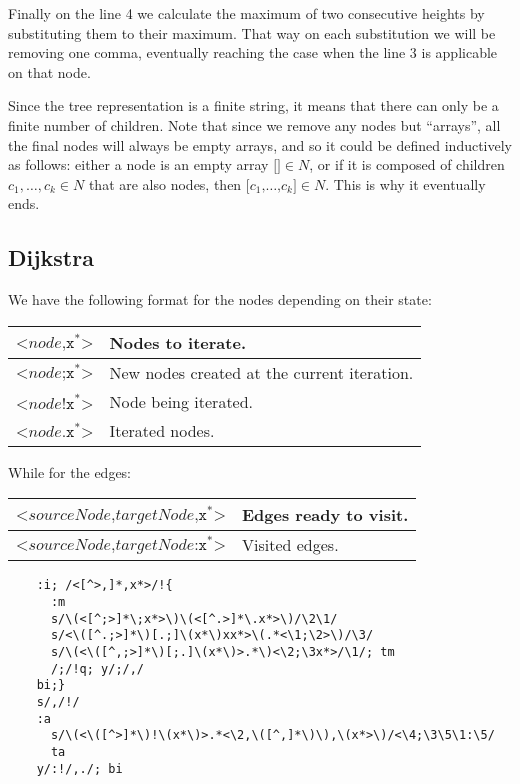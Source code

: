 Finally on the line 4 we calculate the maximum of two consecutive heights
by substituting them to their maximum.  That way on each substitution we
will be removing one comma, eventually reaching the case when the line 3
is applicable on that node.

Since the tree representation is a finite string, it means that there can
only be a finite number of children.  Note that since we remove any nodes
but ``arrays'', all the final nodes will always be empty arrays, and so
it could be defined inductively as follows:
either a node is an empty array $\texttt{[]}\in N$, or if it is
composed of children $c_1, \ldots, c_k\in N$ that are also nodes, then
$\texttt{[}c_1\texttt{,}\ldots\texttt{,}c_k\texttt{]} \in N$.  This is why
it eventually ends.

\subsection{Dijkstra}
We have the following format for the nodes depending on their state:
\begin{center}
	\begin{tabular}{|l|l|}
		\hline
		$\texttt{<}node\texttt{,x}^*\texttt{>}$ & Nodes to iterate.\\
		\hline
		$\texttt{<}node\texttt{;x}^*\texttt{>}$
			& New nodes created at the current iteration.\\
		\hline
		$\texttt{<}node\texttt{!x}^*\texttt{>}$ & Node being iterated.\\
		\hline
		$\texttt{<}node\texttt{.x}^*\texttt{>}$ & Iterated nodes.\\
		\hline
	\end{tabular}
\end{center}

While for the edges:
\begin{center}
	\begin{tabular}{|l|l|}
		\hline
		$\texttt{<}sourceNode\texttt{,}targetNode\texttt{,x}^*\texttt{>}$
			& Edges ready to visit.\\
		\hline
		$\texttt{<}sourceNode\texttt{,}targetNode\texttt{:x}^*\texttt{>}$
			& Visited edges.\\
		\hline
	\end{tabular}
\end{center}

\begin{Verbatim}
	:i; /<[^>,]*,x*>/!{
	  :m
	  s/\(<[^;>]*\;x*>\)\(<[^.>]*\.x*>\)/\2\1/
	  s/<\([^.;>]*\)[.;]\(x*\)xx*>\(.*<\1;\2>\)/\3/
	  s/\(<\([^,;>]*\)[;.]\(x*\)>.*\)<\2;\3x*>/\1/; tm
	  /;/!q; y/;/,/
	bi;}
	s/,/!/
	:a
	  s/\(<\([^>]*\)!\(x*\)>.*<\2,\([^,]*\)\),\(x*>\)/<\4;\3\5\1:\5/
	  ta
	y/:!/,./; bi
\end{Verbatim}



